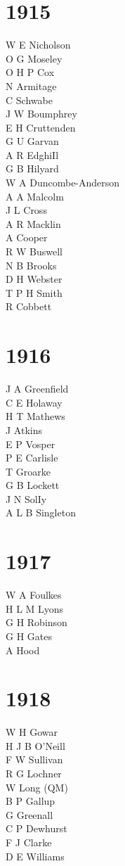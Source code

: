 \begin{multicols}{2}
  \section*{1915}
  W E Nicholson \\
  O G Moseley \\
  O H P Cox \\
  N Armitage \\
  C Schwabe \\
  J W Boumphrey \\
  E H Cruttenden \\
  G U Garvan \\
  A R EdghiIl \\
  G B Hilyard \\
  W A Duncombe-Anderson \\
  A A Malcolm \\
  J L Cross \\
  A R Macklin \\
  A Cooper \\
  R W Buswell \\
  N B Brooks \\
  D H Webster \\
  T P H Smith \\
  R Cobbett \\
  \section*{1916}
  J A Greenfield \\
  C E Holaway \\
  H T Mathews \\
  J Atkins \\
  E P Vosper \\
  P E Carlisle \\
  T Groarke \\
  G B Lockett \\
  J N SolIy \\
  A L B Singleton \\
  \section*{1917}
  W A Foulkes \\
  H L M Lyons \\
  G H Robinson \\
  G H Gates \\
  A Hood \\
  \section*{1918}
  W H Gowar \\
  H J B O'Neill \\
  F W Sullivan \\
  R G Lochner \\
  W Long (QM) \\
  B P Gallup \\
  G Greenall \\
  C P Dewhurst \\
  F J Clarke \\
  D E Williams \\

\end{multicols}
